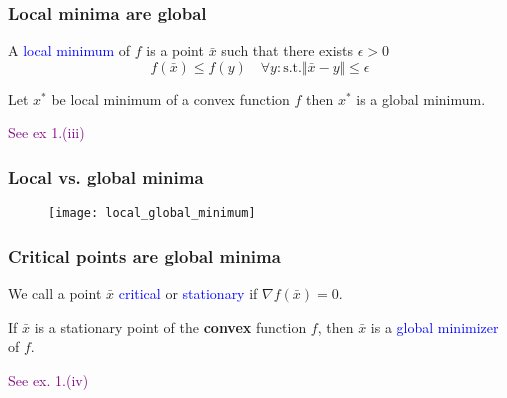 \documentclass{beamer}
\begin{document}
\begin{frame}
  \frametitle{Local minima are global}

  \begin{definition}
    A \textcolor{blue}{local minimum} of $f$ is a point $\bar{x}$ such that there exists $\epsilon>0$
    \begin{equation}
      f(\bar{x}) \le f(y) \quad \forall y: \text{s.t.} \Vert \bar{x}-y \Vert \le \epsilon
    \end{equation}
  \end{definition}

  \begin{lemma}%
    \label{lem:}
    Let $x^*$ be local minimum of a convex function $f$ then $x^*$ is a global minimum.
  \end{lemma}
\textcolor{purple}{See ex 1.(iii)}
\end{frame}

\begin{frame}
  \frametitle{Local vs. global minima}
  \begin{figure}[ht]
    \centering
    \texttt{[image: local\_global\_minimum]}
  \end{figure}


\end{frame}


\begin{frame}
  \frametitle{Critical points are global minima}

  \begin{definition}
    We call a point $\bar{x}$ \textcolor{blue}{critical} or \textcolor{blue}{stationary} if
    $\nabla f(\bar{x}) = 0$.
  \end{definition}
  \begin{lemma}%
    If $\bar{x}$ is a stationary point of the \textbf{convex} function $f$, then $\bar{x}$ is a \textcolor{blue}{global minimizer} of $f$.
  \end{lemma}
  \textcolor{purple}{See ex. 1.(iv)}

\end{frame}
\end{document}

